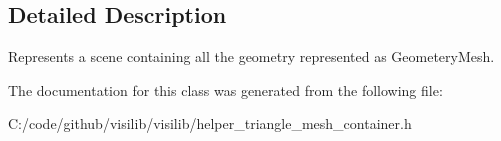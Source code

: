 \subsection{Detailed Description}
Represents a scene containing all the geometry represented as Geometery\+Mesh. 

The documentation for this class was generated from the following file\+:\begin{DoxyCompactItemize}
\item 
C\+:/code/github/visilib/visilib/helper\+\_\+triangle\+\_\+mesh\+\_\+container.\+h\end{DoxyCompactItemize}
